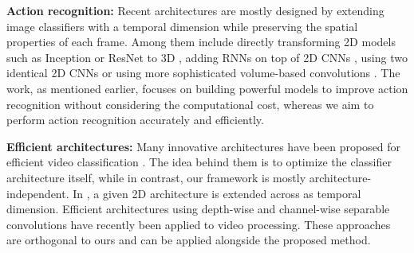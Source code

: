 \documentclass[a4paper,conference]{IEEEtran}
\begin{document}
{\bf Action recognition:} Recent architectures are mostly designed by extending image classifiers with a temporal dimension while preserving the spatial properties of each frame. Among them include directly transforming 2D models \cite{simonyan2014very, krizhevsky2012imagenet, he2016deep, szegedy2015going} such as Inception or ResNet to 3D \cite{carreira2017quo, Hara_2018_CVPR}, adding RNNs on top of 2D CNNs \cite{donahue2015long, li2018recurrent, li2018videolstm, yue2015beyond, sun2017lattice, yosinski2015understanding}, using two identical 2D CNNs or using more sophisticated volume-based convolutions \cite{feichtenhofer2017spatiotemporal,qiu2017learning, taylor2010convolutional, tran2015learning, tran2019video, tran2018closer}. The work, as mentioned earlier, focuses on building powerful models to improve action recognition without considering the computational cost, whereas we aim to perform action recognition accurately and efficiently.

{\bf Efficient architectures:} Many innovative architectures have been proposed for efficient video classification \cite{kopuklu2019resource, zhu2020faster, zolfaghari2018eco, wu2018compressed, wang2018appearance, wang2020video, tran2019video, sun2018optical, piergiovanni2019representation, luo2019grouped, lee2018motion, hussein2019timeception, fan2018end, diba2018spatio, feichtenhofer2020x3d}. The idea behind them is to optimize the classifier architecture itself, while in contrast, our framework is mostly architecture-independent. In \cite{feichtenhofer2020x3d, lin2019tsm}, a given 2D architecture is extended across as temporal dimension. Efficient architectures \cite{howard2017mobilenets, ma2018shufflenet} using depth-wise and channel-wise separable convolutions have recently been applied \cite{kopuklu2019resource, tran2019video} to video processing. These approaches are orthogonal to ours and can be applied alongside the proposed method.
\end{document}
